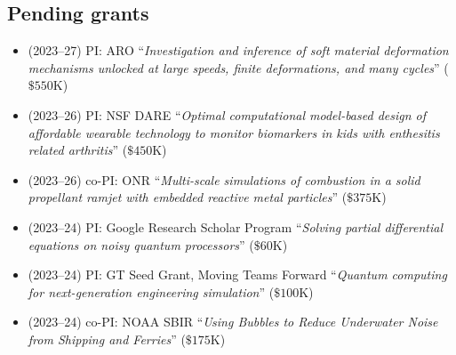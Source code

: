 \subsection{Pending grants}

\begin{itemize}
    \item (2023--27) PI: ARO ``\textit{Investigation and inference of soft material deformation mechanisms unlocked at large speeds, finite deformations, and many cycles}'' ($\$550$K)
    \item (2023--26) PI: NSF DARE ``\textit{Optimal computational model-based design of affordable wearable technology to monitor biomarkers in kids with enthesitis related arthritis}'' ($\$450$K)
    \item (2023--26) co-PI: ONR ``\textit{Multi-scale simulations of combustion in a solid propellant ramjet with embedded reactive metal particles}'' ($\$375$K)
    \item (2023--24) PI: Google Research Scholar Program ``\textit{Solving partial differential equations on noisy quantum processors}'' ($\$60$K)
    \item (2023--24) PI: GT Seed Grant, Moving Teams Forward ``\textit{Quantum computing for next-generation engineering simulation}'' ($\$100$K)
    \item (2023--24) co-PI: NOAA SBIR ``\textit{Using Bubbles to Reduce Underwater Noise from Shipping and Ferries}'' ($\$175$K)
\end{itemize}
